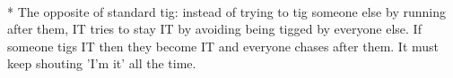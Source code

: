 \begin{minipage}{\textwidth}
\\*
The opposite of standard tig: instead of trying to tig someone else by running
after them, IT tries to stay IT by avoiding being tigged by everyone else. If someone tigs IT then they become IT and everyone chases after them.  It must keep shouting 'I'm it' all the time.
\end{minipage}    \vfill

